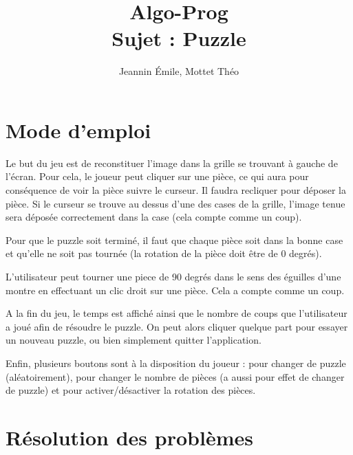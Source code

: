 \documentclass[]{article}
\title{Algo-Prog\\Sujet \no2 : Puzzle}
\author{Jeannin Émile, Mottet Théo}
\begin{document}
\maketitle
\newpage
\section{Mode d'emploi}

Le but du jeu est de reconstituer l'image dans la grille se trouvant à gauche de l'écran. Pour cela, le joueur peut cliquer sur une pièce, ce qui aura pour conséquence de voir la pièce suivre le curseur. Il faudra recliquer pour déposer la pièce. Si le curseur se trouve au dessus d'une des cases de la grille, l'image tenue sera déposée correctement dans la case (cela compte comme un coup).

Pour que le puzzle soit terminé, il faut que chaque pièce soit dans la bonne case et qu'elle ne soit pas tournée (la rotation de la pièce doit être de 0 degrés).

L'utilisateur peut tourner une piece de 90 degrés dans le sens des éguilles d'une montre en effectuant un clic droit sur une pièce. Cela a compte comme un coup.

A la fin du jeu, le temps est affiché ainsi que le nombre de coups que l'utilisateur a joué afin de résoudre le puzzle. On peut alors cliquer quelque part pour essayer un nouveau puzzle, ou bien simplement quitter l'application.

Enfin, plusieurs boutons sont à la disposition du joueur : pour changer de puzzle (aléatoirement), pour changer le nombre de pièces (a aussi pour effet de changer de puzzle) et pour activer/désactiver la rotation des pièces.

\section{Résolution des problèmes}
\end{document}
